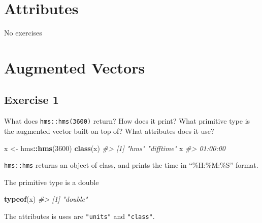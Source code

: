 \documentclass[]{book}
\newenvironment{Shaded}{\begin{snugshade}}{\end{snugshade}}
\newcommand{\CommentTok}[1]{\textcolor[rgb]{0.56,0.35,0.01}{\textit{#1}}}
\newcommand{\DecValTok}[1]{\textcolor[rgb]{0.00,0.00,0.81}{#1}}
\newcommand{\KeywordTok}[1]{\textcolor[rgb]{0.13,0.29,0.53}{\textbf{#1}}}
\newcommand{\NormalTok}[1]{#1}
\newcommand{\OperatorTok}[1]{\textcolor[rgb]{0.81,0.36,0.00}{\textbf{#1}}}
\newcommand{\StringTok}[1]{\textcolor[rgb]{0.31,0.60,0.02}{#1}}
\theoremstyle{definition}
\theoremstyle{definition}
\theoremstyle{definition}
\theoremstyle{remark}
\begin{document}
\hypertarget{attributes}{%
\section{Attributes}\label{attributes}}

No exercises

\hypertarget{augmented-vectors}{%
\section{Augmented Vectors}\label{augmented-vectors}}

\hypertarget{exercise-1-51}{%
\subsection{Exercise 1}\label{exercise-1-51}}

What does \texttt{hms::hms(3600)} return? How does it print? What
primitive type is the augmented vector built on top of? What attributes
does it use?

\begin{Shaded}
\begin{Highlighting}[]
\NormalTok{x <-}\StringTok{ }\NormalTok{hms}\OperatorTok{::}\KeywordTok{hms}\NormalTok{(}\DecValTok{3600}\NormalTok{)}
\KeywordTok{class}\NormalTok{(x)}
\CommentTok{#> [1] "hms"      "difftime"}
\NormalTok{x}
\CommentTok{#> 01:00:00}
\end{Highlighting}
\end{Shaded}

\texttt{hms::hms} returns an object of class, and prints the time in
``\%H:\%M:\%S'' format.

The primitive type is a double

\begin{Shaded}
\begin{Highlighting}[]
\KeywordTok{typeof}\NormalTok{(x)}
\CommentTok{#> [1] "double"}
\end{Highlighting}
\end{Shaded}

The attributes is uses are \texttt{"units"} and \texttt{"class"}.

\begin{Shaded}
\end{Shaded}
\end{document}
